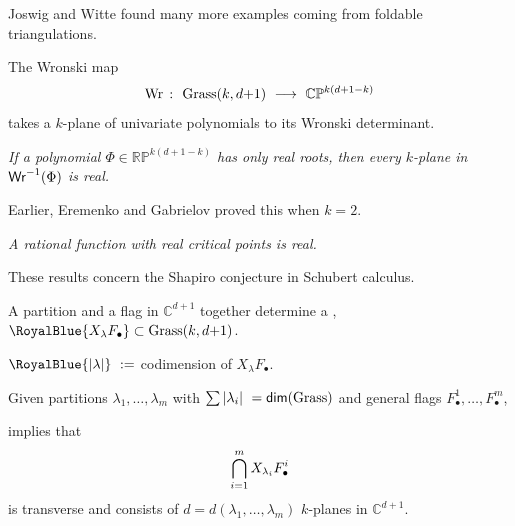 \documentclass[17pt,landscape]{Narrow}
\newcommand{\DeCo}{\RoyalBlue}
\renewcommand{\P}{{\mathbb P}}
\newcommand{\C}{{\mathbb C}}
\newcommand{\R}{{\mathbb R}}
\begin{document}
\begin{flushleft}
Joswig and Witte found many more examples coming from foldable triangulations.



\slide{}
\LogoOn
\begin{center}
\end{center}

The Wronski map\vspace{-8pt}
\[
   \mbox{Wr}\ \colon\ \mbox{Grass}(k,d{+}1) \ \longrightarrow\ \C\P^{k(d+1-k)}\vspace{-8pt}
\]
takes a $k$-plane of univariate polynomials to its Wronski determinant.


{\sl 
 If a polynomial $\Phi\in\R\P^{k(d+1-k)}$ has only real roots, then
 every $k$-plane in $\mbox{\sf Wr}^{-1}(\Phi)$ is real.
}

Earlier, Eremenko and Gabrielov proved this when $k=2$.

{\sl 
  A rational function with real critical points is real.
}

These results concern the Shapiro conjecture in Schubert calculus.


\slide{}
\LogoOn
\begin{center}
\end{center}

A partition \DeCo{$\lambda$} and a flag \DeCo{$F_\bullet$} in $\C^{d+1}$
together determine a \newline\DeCo{Schubert variety},
$\DeCo{X_\lambda F_\bullet}\subset\mbox{Grass}(k,d{+}1)$.

$\DeCo{|\lambda|}\ :=$ codimension of $X_\lambda F_\bullet$.

Given partitions $\lambda_1,\dotsc,\lambda_m$ with 
$\sum|\lambda_i|\ =\mbox{\sf dim}(\mbox{Grass})$ and\newline
general flags $F_\bullet^1,\dotsc,F_\bullet^m$,

 implies that\vspace{-8pt}
\[
   \bigcap_{i=1}^m X_{\lambda_i}F_\bullet^i\vspace{-8pt}
\]
 is transverse and consists of
$d=d(\lambda_1,\dotsc,\lambda_m)$ $k$-planes in $\C^{d+1}$.





\end{flushleft}
\end{document}
